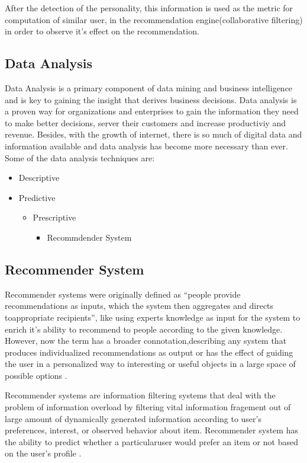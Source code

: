 After the detection of the personality, this information is used as the metric for computation of similar user, in the recommendation engine(collaborative filtering) in order to observe it's effect on the recommendation.

\subsection{Data Analysis}
Data Analysis \cite{analysis} is a primary component of data mining and business intelligence and is key to gaining the insight that derives business decisions. Data analysis is a proven way for organizations and enterprises to gain the information they need to make better decisions, server their customers and increase productiviy and revenue. Besides, with the growth of internet, there is so much of digital data and information available and data analysis has become more necessary than ever. 
Some of the data analysis techniques are:
\begin{itemize}
	\item Descriptive
	\item Predictive
	\begin{itemize}
		\item Prescriptive
		\begin{itemize}
			\item Recommdender System
		\end{itemize}
	\end{itemize}
\end{itemize}
\subsection{Recommender System}
Recommender systems were originally defined as ``people provide recommendations as inputs, which the system then aggregates and directs toappropriate recipients'', like using experts knowledge as input for the system to enrich it's ability to recommend to people according to the given knowledge. However, now the term has a broader connotation,describing any system that produces individualized recommendations as output or has the effect of guiding the user in a personalized way to interesting or useful objects in a large space of possible options \cite{rdef}.

Recommender systems are information filtering systems that deal with the problem of information overload by filtering vital information fragement out of large amount of dynamically generated information according to user's preferences, interest, or observed behavior about item. Recommender system has the ability to predict whether a particularuser would prefer an item or not based on the user's profile \cite{rmain}.

